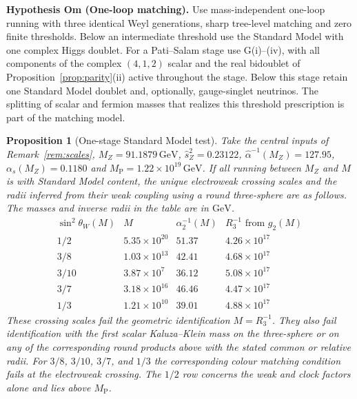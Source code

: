 \documentclass[aps,pra,onecolumn,superscriptaddress,nofootinbib,10pt]{revtex4-2}
\newtheorem{proposition}[theorem]{Proposition}
\theoremstyle{definition}
\theoremstyle{remark}
\begin{document}
\smallskip\noindent\textbf{Hypothesis Om (One-loop matching).}\label{hyp:Om}  Use mass-independent one-loop running with three identical Weyl
generations, sharp tree-level matching and zero finite thresholds.
Below an intermediate threshold use the Standard Model with one
complex Higgs doublet. For a Pati--Salam stage use G(i)--(iv), with
all components of the complex $(4,1,2)$ scalar and the real
bidoublet of Proposition~\ref{prop:parity}(ii) active throughout
the stage. Below this stage retain one Standard Model doublet
and, optionally, gauge-singlet neutrinos. The splitting of scalar
and fermion masses that realizes this threshold prescription is
part of the matching model.


\begin{proposition}[One-stage Standard Model test]\label{cr:onestage}
Take the central inputs of Remark~\ref{rem:scales},
$M_Z=91.1879\,\mathrm{GeV}$, $\hat s_Z^2=0.23122$,
$\hat\alpha^{-1}(M_Z)=127.95$, $\alpha_s(M_Z)=0.1180$ and
$M_{\mathrm P}=1.22\times10^{19}\,\mathrm{GeV}$. If all running
between $M_Z$ and $M$ is with Standard Model content, the unique
electroweak crossing scales and the radii inferred from their weak
coupling using a round three-sphere are as follows. The masses and
inverse radii in the table are in $\mathrm{GeV}$.
\[
 \begin{array}{c|r|r|r}
 \sin^2\theta_W(M)&M&\alpha_2^{-1}(M)& R_3^{-1}\text{ from }g_2(M)\\\hline
 1/2 &5.35\times10^{20}&51.37&4.26\times10^{17}\\
 3/8 &1.03\times10^{13}&42.41&4.68\times10^{17}\\
 3/10&3.87\times10^{7} &36.12&5.08\times10^{17}\\
 3/7 &3.18\times10^{16}&46.46&4.47\times10^{17}\\
 1/3 &1.21\times10^{10}&39.01&4.88\times10^{17}
 \end{array}
\]
These crossing scales fail the geometric identification $M=R_3^{-1}$.
They also fail identification with the first scalar Kaluza--Klein
mass on the three-sphere or on any of the corresponding
round products above with the stated common or
relative radii. For $3/8$, $3/10$, $3/7$, and $1/3$ the
corresponding colour matching condition fails at the electroweak
crossing. The $1/2$ row concerns the weak and clock factors alone
and lies above $M_{\mathrm P}$.
\end{proposition}
\end{document}
